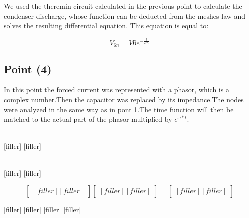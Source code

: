 We used the theremin circuit calculated in the previous point to calculate the condenser discharge, whose function can be deducted from the meshes law and solves the resulting differential equation. This equation is equal to:  

\begin{equation}
  V_{6n}= V6e^{-\frac{t}{RC}}
  \label{eq:kvl}
\end{equation}  


\subsection{Point (4)} 

In this point the forced current was represented with a phasor, which is a complex number.Then the capacitor was replaced by its impedance.The nodes were analyzed in the same way as in pont 1.The time function will then be matched to the actual part of the phasor multiplied by $e^{\omega*t}$. 

\begin{align*} 
[filler]
[filler]
\end{align*}

[filler]
[filler]

\begin{align*} 
[filler]
[filler]
\end{align*}

[filler]
[filler]


$$
\begin{bmatrix} 
[filler]
[filler]
\end {bmatrix} 
\begin{bmatrix}
[filler]
[filler]
\end{bmatrix}
=
\begin{bmatrix}
[filler]
[filler]
\end{bmatrix}
$$


[filler]
[filler]
[filler]
[filler]


%    

%   
